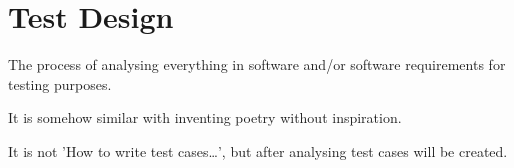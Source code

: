 \section{Test Design}
\label{sec:Test Design}

The process of analysing everything in software and/or software requirements for testing purposes.

It is somehow similar with inventing poetry without inspiration.

It is not 'How to write test cases\ldots', but after analysing test cases will be created.